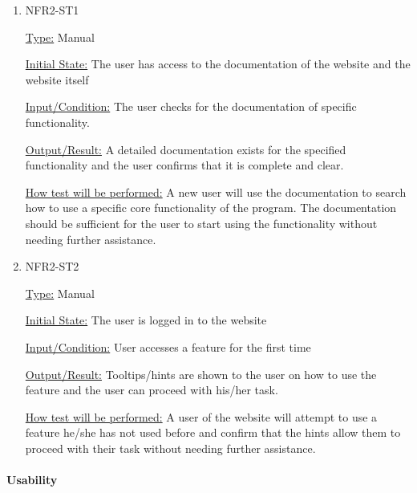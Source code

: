 \documentclass[12pt, titlepage]{article}
\begin{document}
\begin{enumerate}

\item{NFR2-ST1\\}

\underline{Type:} Manual

\underline{Initial State:} The user has access to the documentation of the website and the website itself

\underline{Input/Condition:} The user checks for the documentation of specific functionality.

\underline{Output/Result:} A detailed documentation exists for the specified functionality and the user confirms that it is complete and clear.

\underline{How test will be performed:} 
A new user will use the documentation to search how to use a specific core functionality of the program. The documentation should be sufficient for the user to start using the functionality without needing further assistance.

\item{NFR2-ST2\\}

\underline{Type:} Manual

\underline{Initial State:} The user is logged in to the website

\underline{Input/Condition:} User accesses a feature for the first time

\underline{Output/Result:} Tooltips/hints are shown to the user on how to use the feature and the user can proceed with his/her task.

\underline{How test will be performed:} 
A user of the website will attempt to use a feature he/she has not used before and confirm that the hints allow them to proceed with their task without needing further assistance.

\end{enumerate}

\paragraph{Usability }
\end{document}
